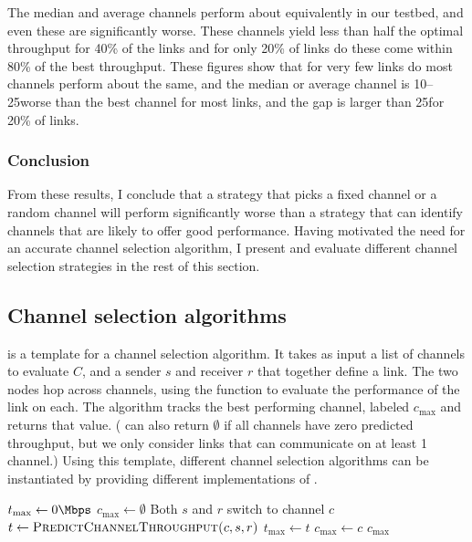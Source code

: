 The median and average channels perform about equivalently in our testbed, and even these are significantly worse. These channels yield less than half the optimal throughput for 40\% of the links and for only 20\% of links do these come within 80\% of the best throughput. These figures show that for very few links do most channels perform about the same, and the median or average channel is 10--25\Mbps worse than the best channel for most links, and the gap is larger than 25\Mbps for 20\% of links.

\subsubsection{Conclusion}
From these results, I conclude that a strategy that picks a fixed channel or a random channel will perform significantly worse than a strategy that can identify channels that are likely to offer good performance. Having motivated the need for an accurate channel selection algorithm, I present and evaluate different channel selection strategies in the rest of this section.

\subsection{Channel selection algorithms}
 is a template for a channel selection algorithm. It takes as input a list of channels to evaluate $C$, and a sender $s$ and receiver $r$ that together define a link. The two nodes hop across channels, using the  function to evaluate the performance of the link on each. The algorithm tracks the best performing channel, labeled $c_{\max}$ and returns that value. ( can also return $\emptyset$ if all channels have zero predicted throughput, but we only consider links that can communicate on at least 1 channel.) Using this template, different channel selection algorithms can be instantiated by providing different implementations of .

\begin{algorithm}[htp]
\caption{\label{alg:chan_sel_basic}}
\begin{algorithmic}
\STATE $t_{\max}\gets 0\Mbps$
\STATE $c_{\max} \gets \emptyset$
\STATE Both $s$ and $r$ switch to channel $c$
\STATE $t \gets \textsc{PredictChannelThroughput($c, s, r$)}$
	\STATE $t_{\max} \gets t$
	\STATE $c_{\max} \gets c$
\ENDIF
\RETURN $c_{\max}$
\ENDFOR
\end{algorithmic}
\end{algorithm}

